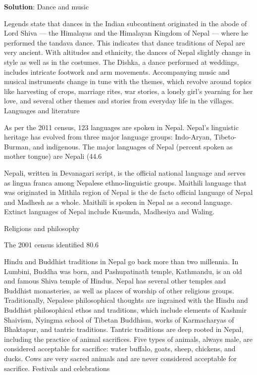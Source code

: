 \documentclass[
  openany]{book}
\newenvironment{solution}{ {\bfseries Solution}:}{}
\begin{document}
\begin{questions}
\begin{solution}
Dance and music

Legends state that dances in the Indian subcontinent originated in the abode of Lord Shiva — the Himalayas and the Himalayan Kingdom of Nepal — where he performed the tandava dance. This indicates that dance traditions of Nepal are very ancient. With altitudes and ethnicity, the dances of Nepal slightly change in style as well as in the costumes. The Dishka, a dance performed at weddings, includes intricate footwork and arm movements. Accompanying music and musical instruments change in tune with the themes, which revolve around topics like harvesting of crops, marriage rites, war stories, a lonely girl’s yearning for her love, and several other themes and stories from everyday life in the villages.
Languages and literature

As per the 2011 census, 123 languages are spoken in Nepal. Nepal’s linguistic heritage has evolved from three major language groups: Indo-Aryan, Tibeto-Burman, and indigenous. The major languages of Nepal (percent spoken as mother tongue) are Nepali (44.6%

Nepali, written in Devanagari script, is the official national language and serves as lingua franca among Nepalese ethno-linguistic groups. Maithili language that was originated in Mithila region of Nepal is the de facto official language of Nepal and Madhesh as a whole. Maithili is spoken in Nepal as a second language. Extinct languages of Nepal include Kusunda, Madhesiya and Waling.

Religions and philosophy

The 2001 census identified 80.6%

Hindu and Buddhist traditions in Nepal go back more than two millennia. In Lumbini, Buddha was born, and Pashupatinath temple, Kathmandu, is an old and famous Shiva temple of Hindus. Nepal has several other temples and Buddhist monasteries, as well as places of worship of other religious groups. Traditionally, Nepalese philosophical thoughts are ingrained with the Hindu and Buddhist philosophical ethos and traditions, which include elements of Kashmir Shaivism, Nyingma school of Tibetan Buddhism, works of Karmacharyas of Bhaktapur, and tantric traditions. Tantric traditions are deep rooted in Nepal, including the practice of animal sacrifices. Five types of animals, always male, are considered acceptable for sacrifice: water buffalo, goats, sheep, chickens, and ducks. Cows are very sacred animals and are never considered acceptable for sacrifice.
Festivals and celebrations


\end{solution}
\end{questions}
\end{document}
